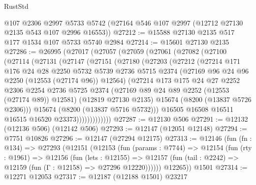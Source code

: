 \begin{lexlean}{RustStd}
\begin{coremodule}
    @107
    @2306
    @2997
    @5733
    @5742
    (@27164 @546 @107 @2997 (@12712 @27130 @2135 @543 @107 @2996 @16553))
@27212 := @15588 @27130 @2135 @517 @177 @1534 @107 @5733 @5740 @2984
@27214 := @15601 @27130 @2135
@27286 := @26995
    (@27017
      (@27057
        (@27059
          (@27061
            (@27082
              (@27100
                (@27114
                  (@27131
                    (@27147
                      (@27151
                        (@27180
                          (@27203
                            (@27212
                              (@27214
                                @171
                                @176
                                @24
                                @28
                                @2250
                                @5732
                                @5739
                                @2736
                                @5715
                                @2374
                                (@27169 @96 @24 @96 @2250 (@12553 (@27174 @96)) @12564)
                                (@27214
                                  @173
                                  @175
                                  @24
                                  @27
                                  @2252
                                  @2306
                                  @2254
                                  @2736
                                  @5725
                                  @2374
                                  (@27169 @89 @24 @89 @2252 (@12553 (@27174 @89)) @12581)
                                  (@12819 @27130 @2135)
                                  @15674
                                  (@8200 (@13837 @5726 @2306)))
                                @15674
                                (@8200 (@13837 @5716 @5732)))
                              @16505
                              @16508
                              @16511
                              @16515
                              @16520
                              @23373)))))))))))))
@27287 := @12130 @506
@27291 := @12132 (@12136 @506) (@12142 @506)
@27293 := @12147 (@12051 @12148)
@27294 := @7751 @10826
@27296 := @12147 (@27294 @12175)
@27313 := @12146
    (fun (fn : @134) =>
    @27293
      (@12151
        (@12153
          (fun (params : @7744) =>
          @12154
            (fun (rty : @1961) =>
            @12156
              (fun (lets : @12155) =>
              @12157 (fun (tail : @2242) => @12159 (fun (Γ : @12158) => @27296 @12220))))))
        @12265))
    @1501
@27314 := @12271 @12053
@27317 := @12187 (@12188 @1501) @23217

\end{coremodule}
\end{lexlean}
